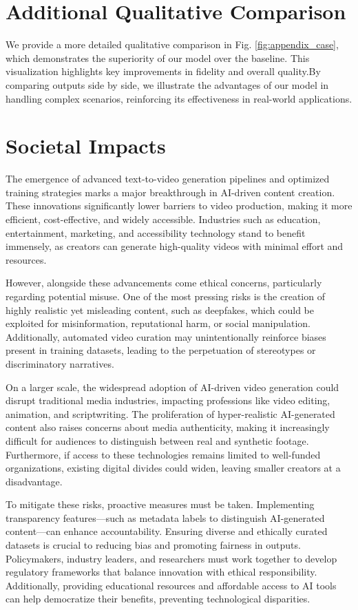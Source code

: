 \section{Additional Qualitative Comparison}
We provide a more detailed qualitative comparison in Fig. \ref{fig:appendix_case}, which demonstrates the superiority of our model over the baseline. This visualization highlights key improvements in fidelity and overall quality.By comparing outputs side by side, we illustrate the advantages of our model in handling complex scenarios, reinforcing its effectiveness in real-world applications.
\section{Societal Impacts}
The emergence of advanced text-to-video generation pipelines and optimized training strategies marks a major breakthrough in AI-driven content creation. These innovations significantly lower barriers to video production, making it more efficient, cost-effective, and widely accessible. Industries such as education, entertainment, marketing, and accessibility technology stand to benefit immensely, as creators can generate high-quality videos with minimal effort and resources.

However, alongside these advancements come ethical concerns, particularly regarding potential misuse. One of the most pressing risks is the creation of highly realistic yet misleading content, such as deepfakes, which could be exploited for misinformation, reputational harm, or social manipulation. Additionally, automated video curation may unintentionally reinforce biases present in training datasets, leading to the perpetuation of stereotypes or discriminatory narratives.

On a larger scale, the widespread adoption of AI-driven video generation could disrupt traditional media industries, impacting professions like video editing, animation, and scriptwriting. The proliferation of hyper-realistic AI-generated content also raises concerns about media authenticity, making it increasingly difficult for audiences to distinguish between real and synthetic footage. Furthermore, if access to these technologies remains limited to well-funded organizations, existing digital divides could widen, leaving smaller creators at a disadvantage.

To mitigate these risks, proactive measures must be taken. Implementing transparency features—such as metadata labels to distinguish AI-generated content—can enhance accountability. Ensuring diverse and ethically curated datasets is crucial to reducing bias and promoting fairness in outputs. Policymakers, industry leaders, and researchers must work together to develop regulatory frameworks that balance innovation with ethical responsibility. Additionally, providing educational resources and affordable access to AI tools can help democratize their benefits, preventing technological disparities.


